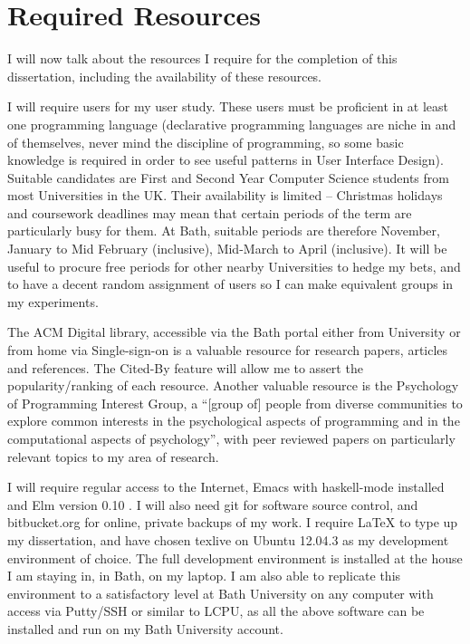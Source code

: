 \documentclass[11pt,openright,a4paper]{report}
\begin{document}
\chapter{Required Resources}

I will now talk about the resources I require for the completion of this
dissertation, including the availability of these resources.

I will require users for my user study. These users must be proficient in at
least one programming language (declarative programming languages are niche in
and of themselves, never mind the discipline of programming, so some basic
knowledge is required in order to see useful patterns in User Interface Design).
Suitable candidates are First and Second Year
Computer Science students from most Universities in the UK. Their availability
is limited -- Christmas holidays and coursework deadlines may mean that certain
periods of the term are particularly busy for them. At Bath, suitable periods are
therefore November, January to Mid February (inclusive), Mid-March to April
(inclusive). It will be useful to procure free periods for other nearby
Universities to hedge my bets, and to have a decent random assignment of users so I
can make equivalent groups in my experiments.

The ACM Digital library, accessible via the Bath portal either from University
or from home via Single-sign-on is a valuable resource for research papers,
articles and references. The Cited-By feature will allow me to assert the
popularity/ranking of each resource. Another valuable resource is the Psychology
of Programming Interest Group, a ``[group of] people from diverse communities to explore
common interests in the psychological aspects of programming and in the
computational aspects of psychology'', with peer reviewed papers on particularly
relevant topics to my area of research.

I will require regular access to the Internet, Emacs with haskell-mode installed and Elm version 0.10
\cite{Elm2013a}. I will also need git for software source control, and
bitbucket.org for online, private backups of my work.
I require LaTeX to type up my dissertation, and have chosen texlive on Ubuntu 12.04.3
as my development environment of choice. The full development environment is
installed at the house I am staying in, in Bath, on my laptop. I am also able to
replicate this environment to a satisfactory level at Bath University on any
computer with access via Putty/SSH or similar to LCPU, as all the above software
can be installed and run on my Bath University account.
\end{document}
